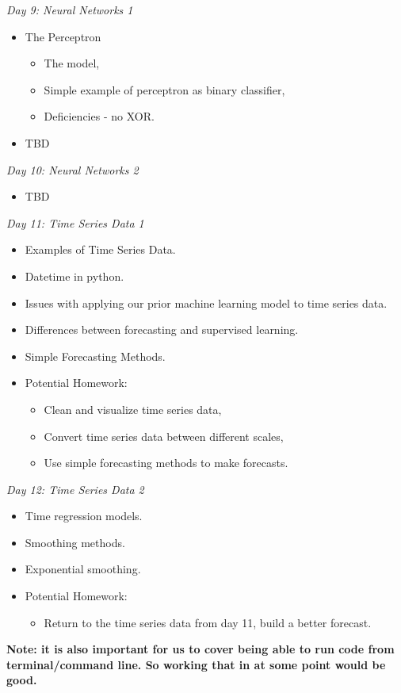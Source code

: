 \documentclass[12pt]{article}
\begin{document}
	
	\vspace{2mm}
	\noindent
	\textit{\large{Day 9: Neural Networks 1}}
		\begin{itemize}
			\item The Perceptron
				\begin{itemize}
					\item The model,
					\item Simple example of perceptron as binary classifier,
					\item Deficiencies - no XOR.
				\end{itemize}
			\item TBD
		\end{itemize}
	
	\noindent 
	
	
	\vspace{2mm}
	\noindent
	\textit{\large{Day 10: Neural Networks 2}}
		\begin{itemize}
			\item TBD
		\end{itemize}
	
	
	
	\vspace{2mm}
	\noindent
	\textit{\large{Day 11: Time Series Data 1}} 
		\begin{itemize}
			\item Examples of Time Series Data.
			\item Datetime in python.
			\item Issues with applying our prior machine learning model to time series data.
			\item Differences between forecasting and supervised learning.
			\item Simple Forecasting Methods.
			\item Potential Homework:
				\begin{itemize}
					\item Clean and visualize time series data,
					\item Convert time series data between different scales,
					\item Use simple forecasting methods to make forecasts.
				\end{itemize}
		\end{itemize}
	
	\vspace{2mm}
	\noindent
	\textit{\large{Day 12: Time Series Data 2}} 
		\begin{itemize}
			\item Time regression models.
			\item Smoothing methods.
			\item Exponential smoothing.
			\item Potential Homework:
			\begin{itemize}
				\item Return to the time series data from day 11, build a better forecast.
			\end{itemize}
		\end{itemize}
	
	
	\textbf{Note: it is also important for us to cover being able to run code from terminal/command line. So working that in at some point would be good.}
\end{document}
